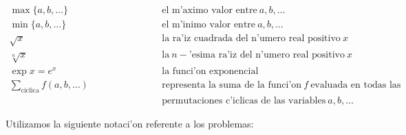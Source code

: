 $$
\begin{array}{lcl}
\max \{a, b, \dots \} & \hspace{1in} & \mbox{el m'aximo valor
entre} \ a, b, \dots \\
\min \{ a, b, \dots \} & \hspace{1in} & \mbox{el m'inimo valor
entre} \ a, b, \dots \\
\sqrt{x} & \hspace{1in} & \mbox{la ra'iz cuadrada del n'umero real positivo} \ x\\
\sqrt[n]{x} & \hspace{1in} & \mbox{la} \ n-\mbox{'esima ra'iz 
del n'umero real positivo} \ x\\
\exp{x}=e^x & \hspace{1in} & \mbox{la funci'on exponencial}\\
\displaystyle{\sum_{\text{c\'iclica}}} f(a,b, \dots) & \hspace{1in} & \mbox{representa la suma de la 
 funci'on} \ f \ \mbox{evaluada en todas las}\\
& & \mbox{permutaciones c'iclicas de las variables} \ a, b, \dots
\end{array}
$$


\vei

Utilizamos la siguiente notaci'on referente a los problemas:

\ven

